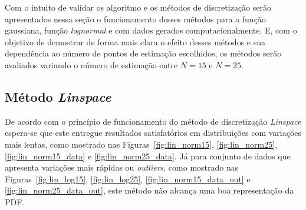 Com o intuito de validar os algoritmo e os métodos de discretização serão apresentados nessa seção o funcionamento desses métodos para a função gaussiana, função \textit{lognormal} e com dados gerados computacionalmente. E, com o objetivo de demostrar de forma mais clara o efeito desses métodos e sua dependência ao número de pontos de estimação escolhidos, os métodos serão avaliados variando o número de estimação entre $ N = 15 $ e $ N = 25 $.

\subsection{Método \textit{Linspace}}

De acordo com o princípio de funcionamento do método de discretização \textit{Linspace} espera-se que este entregue resultados satisfatórios em distribuições com variações mais lentas, como mostrado nas Figuras~\ref{fig:lin_norm15}, \ref{fig:lin_norm25}, \ref{fig:lin_norm15_data} e \ref{fig:lin_norm25_data}. Já para conjunto de dados que apresenta variações mais rápidas ou \textit{outliers}, como mostrado nas Figuras~\ref{fig:lin_log15}, \ref{fig:lin_log25}, \ref{fig:lin_norm15_data_out} e \ref{fig:lin_norm25_data_out}, este método não alcança uma boa representação da PDF.


